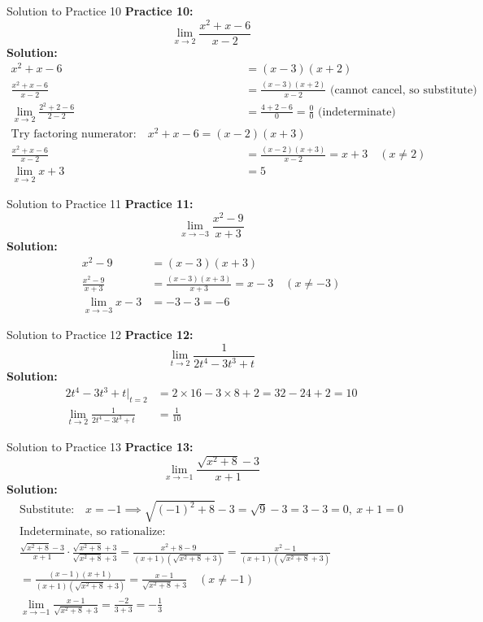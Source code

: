 \documentclass[aspectratio=169]{beamer}
\begin{document}
\begin{frame}{Solution to Practice 10}
\textbf{Practice 10:}
\[
\lim_{x \to 2} \frac{x^2+x-6}{x-2}
\]
\textbf{Solution:}
\begin{align*}
x^2+x-6 &= (x-3)(x+2) \\
\frac{x^2+x-6}{x-2} &= \frac{(x-3)(x+2)}{x-2} \text{ (cannot cancel, so substitute)} \\
\lim_{x \to 2} \frac{2^2+2-6}{2-2} &= \frac{4+2-6}{0} = \frac{0}{0} \text{ (indeterminate)} \\
\text{Try factoring numerator:}\quad x^2+x-6 = (x-2)(x+3) \\
\frac{x^2+x-6}{x-2} &= \frac{(x-2)(x+3)}{x-2} = x+3 \quad (x \neq 2) \\
\lim_{x \to 2} x+3 &= 5
\end{align*}
\end{frame}

\begin{frame}{Solution to Practice 11}
\textbf{Practice 11:}
\[
\lim_{x \to -3} \frac{x^2-9}{x+3}
\]
\textbf{Solution:}
\begin{align*}
x^2-9 &= (x-3)(x+3) \\
\frac{x^2-9}{x+3} &= \frac{(x-3)(x+3)}{x+3} = x-3 \quad (x \neq -3) \\
\lim_{x \to -3} x-3 &= -3-3 = -6
\end{align*}
\end{frame}

\begin{frame}{Solution to Practice 12}
\textbf{Practice 12:}
\[
\lim_{t \to 2} \frac{1}{2t^4-3t^3+t}
\]
\textbf{Solution:}
\begin{align*}
2t^4-3t^3+t \big|_{t=2} &= 2\times 16 - 3\times 8 + 2 = 32-24+2 = 10 \\
\lim_{t \to 2} \frac{1}{2t^4-3t^3+t} &= \frac{1}{10}
\end{align*}
\end{frame}

\begin{frame}{Solution to Practice 13}
\textbf{Practice 13:}
\[
\lim_{x \to -1} \frac{\sqrt{x^2+8}-3}{x+1}
\]
\textbf{Solution:}
\begin{align*}
\text{Substitute:}\quad x=-1 \implies \sqrt{(-1)^2+8}-3 = \sqrt{9}-3 = 3-3=0,\ x+1=0 \\
\text{Indeterminate, so rationalize:} \\
\frac{\sqrt{x^2+8}-3}{x+1} \cdot \frac{\sqrt{x^2+8}+3}{\sqrt{x^2+8}+3} = \frac{x^2+8-9}{(x+1)(\sqrt{x^2+8}+3)} = \frac{x^2-1}{(x+1)(\sqrt{x^2+8}+3)} \\
= \frac{(x-1)(x+1)}{(x+1)(\sqrt{x^2+8}+3)} = \frac{x-1}{\sqrt{x^2+8}+3} \quad (x \neq -1) \\
\lim_{x \to -1} \frac{x-1}{\sqrt{x^2+8}+3} = \frac{-2}{3+3} = -\frac{1}{3}
\end{align*}
\end{frame}
\end{document}
